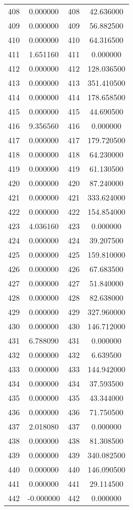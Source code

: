 \documentclass[12pt]{article}
\begin{document}
\begin{longtable}{@{}cccc@{}}
408 & 0.000000 & 408 & 42.636000 \\
409 & 0.000000 & 409 & 56.882500 \\
410 & 0.000000 & 410 & 64.316500 \\
411 & 1.651160 & 411 & 0.000000 \\
412 & 0.000000 & 412 & 128.036500 \\
413 & 0.000000 & 413 & 351.410500 \\
414 & 0.000000 & 414 & 178.658500 \\
415 & 0.000000 & 415 & 44.690500 \\
416 & 9.356560 & 416 & 0.000000 \\
417 & 0.000000 & 417 & 179.720500 \\
418 & 0.000000 & 418 & 64.230000 \\
419 & 0.000000 & 419 & 61.130500 \\
420 & 0.000000 & 420 & 87.240000 \\
421 & 0.000000 & 421 & 333.624000 \\
422 & 0.000000 & 422 & 154.854000 \\
423 & 4.036160 & 423 & 0.000000 \\
424 & 0.000000 & 424 & 39.207500 \\
425 & 0.000000 & 425 & 159.810000 \\
426 & 0.000000 & 426 & 67.683500 \\
427 & 0.000000 & 427 & 51.840000 \\
428 & 0.000000 & 428 & 82.638000 \\
429 & 0.000000 & 429 & 327.960000 \\
430 & 0.000000 & 430 & 146.712000 \\
431 & 6.788090 & 431 & 0.000000 \\
432 & 0.000000 & 432 & 6.639500 \\
433 & 0.000000 & 433 & 144.942000 \\
434 & 0.000000 & 434 & 37.593500 \\
435 & 0.000000 & 435 & 43.344000 \\
436 & 0.000000 & 436 & 71.750500 \\
437 & 2.018080 & 437 & 0.000000 \\
438 & 0.000000 & 438 & 81.308500 \\
439 & 0.000000 & 439 & 340.082500 \\
440 & 0.000000 & 440 & 146.090500 \\
441 & 0.000000 & 441 & 29.114500 \\
442 & -0.000000 & 442 & 0.000000 \\

\end{longtable}
\end{document}
